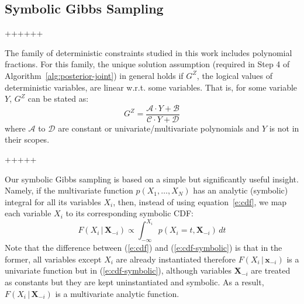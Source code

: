 \documentclass{article}
\newcommand{\bvec}[1]{\textbf{#1}}
\newcommand{\pr}{p}
\begin{document}
\subsection{Symbolic Gibbs Sampling}
++++++


The family of deterministic constraints studied in this work includes polynomial fractions.
For this family, 
the unique solution assumption (required in Step 4 of Algorithm~\ref{alg:posterior-joint})
in general holds if $G^Z$, the logical values of deterministic variables, are linear w.r.t. some variables.
That is, for some variable $Y$, $G^Z$ can be stated as: 
{\footnotesize
\begin{equation}
\label{eq:evidence-form}
G^Z = \frac{\mathcal{A} \cdot Y + \mathcal{B}}{\mathcal{C} \cdot Y + \mathcal{D}}
\end{equation}
}
where $\mathcal{A}$ to $\mathcal{D}$ are constant or univariate/multivariate polynomials and $Y$ is not in their scopes.

+++++

Our symbolic Gibbs sampling is based on a simple but significantly useful insight.
Namely, if the multivariate function $\pr(X_1, \ldots, X_N)$
has an analytic (symbolic) integral for all its variables $X_i$,
then, instead of using equation~\ref{e:cdf}, we map each variable $X_i$ to its corresponding symbolic CDF: 
{\footnotesize
\begin{equation}
\label{e:cdf-symbolic}
F(X_i  \,|\, \bvec{X}_{-i}) 
\propto
\int_{-\infty}^{X_i} \!\!\!\!\! \pr(X_i = t , \bvec{X}_{-i}) \, d  t
\end{equation} 
}
Note that the difference between (\ref{e:cdf}) and (\ref{e:cdf-symbolic}) is that in the former, 
all variables except $X_i$ are already instantiated therefore 
$F(X_i  \,|\, \bvec{x}_{-i})$ is a univariate function but in  (\ref{e:cdf-symbolic}), 
although variables $\bvec{X}_{-i}$ are treated as constants but they are kept uninstantiated and symbolic.
As a result, $F(X_i \,|\, \bvec{X}_{-i})$ is a multivariate analytic function. 
\end{document}
